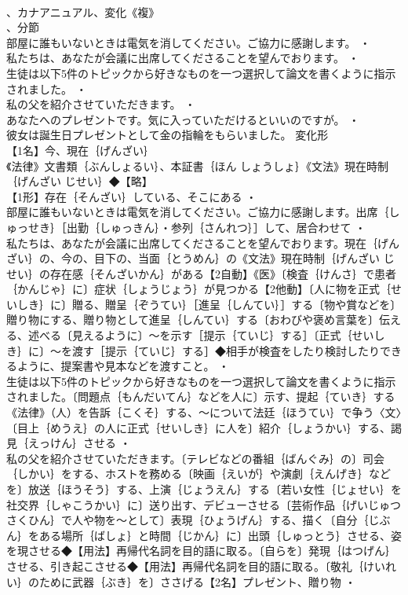 \documentclass[8pt]{extreport}
\begin{document}
\begin{CJK}{UTF8}{min}
\\	、カナアニュアル、変化《複》
\\	、分節
\\	部屋に誰もいないときは電気を消してください。ご協力に感謝します。 ・
\\	私たちは、あなたが会議に出席してくださることを望んでおります。 ・
\\	生徒は以下5件のトピックから好きなものを一つ選択して論文を書くように指示されました。 ・
\\	私の父を紹介させていただきます。 ・
\\	あなたへのプレゼントです。気に入っていただけるといいのですが。 ・
\\	彼女は誕生日プレゼントとして金の指輪をもらいました。	変化形 
\\	【1名】今、現在｛げんざい｝
\\	《法律》文書類｛ぶんしょるい｝、本証書｛ほん しょうしょ｝《文法》現在時制｛げんざい じせい｝◆【略】
\\	【1形】存在｛そんざい｝している、そこにある ・
\\	部屋に誰もいないときは電気を消してください。ご協力に感謝します。出席｛しゅっせき｝［出勤｛しゅっきん｝・参列｛さんれつ｝］して、居合わせて ・
\\	私たちは、あなたが会議に出席してくださることを望んでおります。現在｛げんざい｝の、今の、目下の、当面｛とうめん｝の《文法》現在時制｛げんざい じせい｝の存在感｛そんざいかん｝がある【2自動】《医》〔検査｛けんさ｝で患者｛かんじゃ｝に〕症状｛しょうじょう｝が見つかる【2他動】〔人に物を正式｛せいしき｝に〕贈る、贈呈｛ぞうてい｝［進呈｛しんてい｝］する〔物や賞などを〕贈り物にする、贈り物として進呈｛しんてい｝する〔おわびや褒め言葉を〕伝える、述べる〔見えるように〕～を示す［提示｛ていじ｝する］〔正式｛せいしき｝に〕～を渡す［提示｛ていじ｝する］◆相手が検査をしたり検討したりできるように、提案書や見本などを渡すこと。 ・
\\	生徒は以下5件のトピックから好きなものを一つ選択して論文を書くように指示されました。〔問題点｛もんだいてん｝などを人に〕示す、提起｛ていき｝する《法律》（人）を告訴｛こくそ｝する、～について法廷｛ほうてい｝で争う〈文〉〔目上｛めうえ｝の人に正式｛せいしき｝に人を〕紹介｛しょうかい｝する、謁見｛えっけん｝させる ・
\\	私の父を紹介させていただきます。〔テレビなどの番組｛ばんぐみ｝の〕司会｛しかい｝をする、ホストを務める〔映画｛えいが｝や演劇｛えんげき｝などを〕放送｛ほうそう｝する、上演｛じょうえん｝する〔若い女性｛じょせい｝を社交界｛しゃこうかい｝に〕送り出す、デビューさせる〔芸術作品｛げいじゅつ さくひん｝で人や物を～として〕表現｛ひょうげん｝する、描く〔自分｛じぶん｝をある場所｛ばしょ｝と時間｛じかん｝に〕出頭｛しゅっとう｝させる、姿を現させる◆【用法】再帰代名詞を目的語に取る。〔自らを〕発現｛はつげん｝させる、引き起こさせる◆【用法】再帰代名詞を目的語に取る。〔敬礼｛けいれい｝のために武器｛ぶき｝を〕ささげる【2名】プレゼント、贈り物 ・

\end{CJK}
\end{document}
